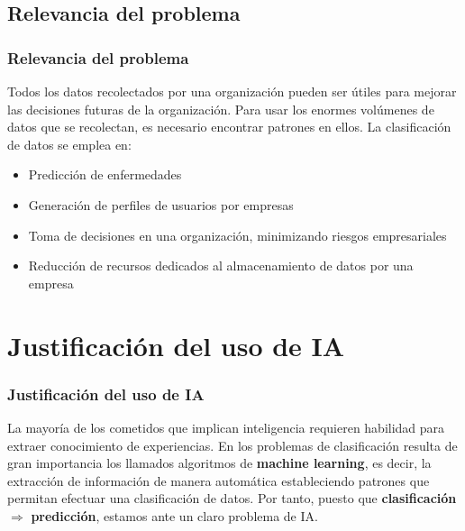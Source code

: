 \documentclass[8pt]{beamer}
\begin{document}
\subsection{Relevancia del problema}
  \begin{frame}
    \frametitle{Relevancia del problema}
    
    Todos los datos recolectados por una organización pueden ser útiles para
    mejorar las decisiones futuras de la organización. Para usar los enormes
    volúmenes de datos que se recolectan, es necesario encontrar patrones en
    ellos. La clasificación de datos se emplea en:
    
    \pause
    \begin{itemize}[<+->]
     \item Predicción de enfermedades
     \item Generación de perfiles de usuarios por empresas
     \item Toma de decisiones en una organización, minimizando riesgos empresariales
     \item Reducción de recursos dedicados al almacenamiento de datos por una empresa
    \end{itemize}
  \end{frame}
  

\section{Justificación del uso de IA}
  \begin{frame}
    \frametitle{Justificación del uso de IA}
      La mayoría de los cometidos que implican inteligencia requieren habilidad
      para extraer conocimiento de experiencias. En los problemas de clasificación
      resulta de gran importancia los llamados algoritmos de \textbf{machine learning},
      es decir, la extracción de información de manera automática estableciendo patrones
      que permitan efectuar una clasificación de datos. Por tanto, puesto que
      \textbf{clasificación} $\Longrightarrow$ \textbf{predicción}, estamos ante un claro problema de IA.
  \end{frame}
\end{document}
